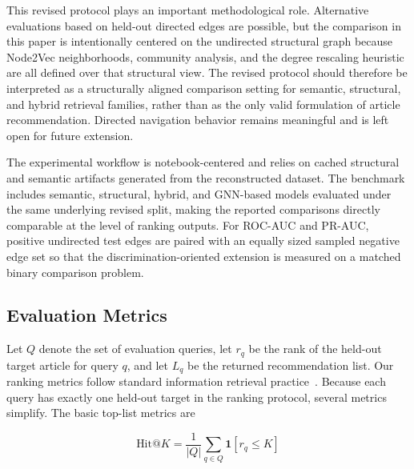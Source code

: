 \documentclass[runningheads]{llncs}
\begin{document}
This revised protocol plays an important methodological role. Alternative
evaluations based on held-out directed edges are possible, but the comparison
in this paper is intentionally centered on the undirected structural
graph because Node2Vec neighborhoods, community analysis, and the degree
rescaling heuristic are all defined over that structural view. The revised
protocol should therefore be interpreted as a structurally aligned comparison
setting for semantic, structural, and hybrid retrieval families, rather than
as the only valid formulation of article recommendation. Directed navigation
behavior remains meaningful and is left open for future extension.

The experimental workflow is notebook-centered and relies on cached structural
and semantic artifacts generated from the reconstructed dataset. The benchmark
includes semantic, structural, hybrid, and GNN-based models evaluated under the
same underlying revised split, making the reported comparisons directly
comparable at the level of ranking outputs. For ROC-AUC and PR-AUC, positive
undirected test edges are paired with an equally sized sampled negative edge
set so that the discrimination-oriented extension is measured on a matched
binary comparison problem.

\subsection{Evaluation Metrics}

Let \(Q\) denote the set of evaluation queries, let \(r_q\) be the rank of the
held-out target article for query \(q\), and let \(L_q\) be the returned
recommendation list. Our ranking metrics follow standard information retrieval
practice~\cite{manning2008ir,voorhees1999trec8qa}. Because each query has
exactly one held-out target in the ranking protocol, several metrics simplify.
The basic top-list metrics are

\begin{equation}
\text{Hit@}K = \frac{1}{|Q|}\sum_{q \in Q} \mathbf{1}[r_q \le K]
\end{equation}
\end{document}
